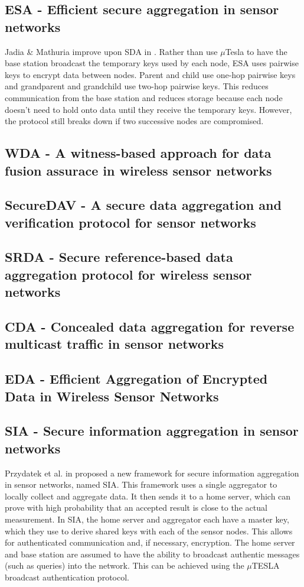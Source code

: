 \documentclass[a4paper]{article}
\begin{document}
\subsection{ESA - Efficient secure aggregation in sensor networks}
Jadia \& Mathuria improve upon SDA in \cite{ESA}. Rather than use $\mu$Tesla
to have the base station broadcast the temporary keys used by each node, ESA
uses pairwise keys to encrypt data between nodes. Parent and child use one-hop
pairwise keys and grandparent and grandchild use two-hop pairwise keys. This
reduces communication from the base station and reduces storage because each
node doesn't need to hold onto data until they receive the temporary
keys. However, the protocol still breaks down if two successive nodes are
compromised.

\subsection{WDA - A witness-based approach for data fusion assurace in wireless sensor networks}

\subsection{SecureDAV - A secure data aggregation and verification protocol for sensor networks}

\subsection{SRDA - Secure reference-based data aggregation protocol for wireless sensor networks}

\subsection{CDA - Concealed data aggregation for reverse multicast traffic in sensor networks}

\subsection{EDA - Efficient Aggregation of Encrypted Data in Wireless Sensor Networks}

\subsection{SIA - Secure information aggregation in sensor networks}

Przydatek et al. in \cite{SIA} proposed a new framework for secure information
aggregation in sensor networks, named SIA. This framework uses a single
aggregator to locally collect and aggregate data. It then sends it to a home
server, which can prove with high probability that an accepted result is close
to the actual measurement. In SIA, the home server and aggregator each have a
master key, which they use to derive shared keys with each of the sensor
nodes. This allows for authenticated communication and, if necessary,
encryption. The home server and base station are assumed to have the ability
to broadcast authentic messages (such as queries) into the network. This can
be achieved using the $\mu$TESLA broadcast authentication protocol.
\end{document}

